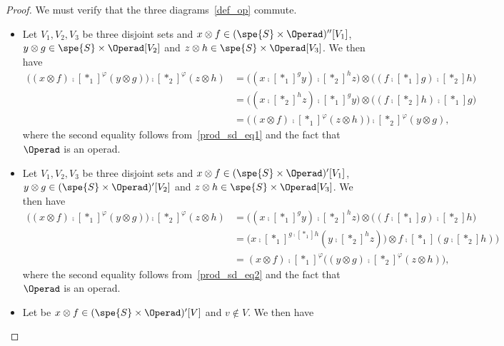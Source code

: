 \begin{proof}
    We must verify that the three diagrams~\eqref{def_op} commute.
    \begin{itemize} 
        \item Let $V_1,V_2,V_3$ be three disjoint sets and $x\otimes f\in(\spe{S}\times\Operad)''[V_1]$, 
        $y\otimes g\in\spe{S}\times\Operad[V_2]$ and $z\otimes h\in\spe{S}\times\Operad[V_3]$. We then have
        \begin{equation}\begin{split}
            \big((x\otimes f) \comp[\ast_1]^{\varphi} (y\otimes g)\big)\comp[\ast_2]^{\varphi} (z\otimes h) 
            &= \big( (x \comp[\ast_1]^g y) \comp[\ast_2]^h z \big)  \otimes  \big((f\comp[\ast_1]g)\comp[\ast_2]h \big) \\
            &= \big( (x \comp[\ast_2]^h z) \comp[\ast_1]^g y \big)  \otimes  \big((f\comp[\ast_2]h)\comp[\ast_1]g \big) \\
            &= \big( (x\otimes f) \comp[\ast_1]^{\varphi} (z\otimes h) \big) \comp[\ast_2]^{\varphi} (y\otimes g),
        \end{split}\end{equation}
        where the second equality follows from~\eqref{prod_sd_eq1} and the fact that $\Operad$ is an operad.
        \item Let $V_1,V_2,V_3$ be three disjoint sets and $x\otimes f\in(\spe{S}\times\Operad)'[V_1]$, 
        $y\otimes g\in(\spe{S}\times\Operad)'[V_2]$ and $z\otimes h\in\spe{S}\times\Operad[V_3]$. We then have
        \begin{equation}\begin{split}
            \big((x\otimes f) \comp[\ast_1]^{\varphi} (y\otimes g)\big)\comp[\ast_2]^{\varphi} (z\otimes h) 
            &= \big( (x\comp[\ast_1]^g y)\comp[\ast_2]^h z \big)  \otimes  \big( (f\comp[\ast_1]g)\comp[\ast_2]h \big) \\
            &= \big( x\comp[\ast_1]^{g\comp[\ast_1]h}( y\comp[\ast_2]^h z) \big)  \otimes  f\comp[\ast_1](g\comp[\ast_2]h) \big) \\
            &= (x\otimes f)\comp[\ast_1]^{\varphi}\big( (y\otimes g)\comp[\ast_2]^{\varphi}(z\otimes h)\big),
        \end{split}\end{equation} 
        where the second equality follows from~\eqref{prod_sd_eq2} and the fact that $\Operad$ is an operad.
        \item Let be $x\otimes f\in(\spe{S}\times\Operad)'[V]$ and $v\not\in V$. We then have 

\end{itemize}
\end{proof}
